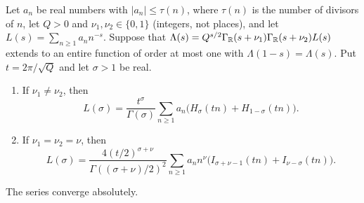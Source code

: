 \begin{lemma}\label{an:balanced-afe}
Let $a_n$ be real numbers with $|a_n|\le\tau(n)$, where $\tau(n)$ is the
number of divisors of $n$, let $Q>0$ and
$\nu_1,\nu_2\in\{0,1\}$ (integers, not places), and let
$L(s)=\sum_{n\ge1}a_nn^{-s}$. Suppose that
$\Lambda(s)=Q^{s/2}\Gamma_\mathbb R(s+\nu_1)\Gamma_\mathbb R(s+\nu_2)L(s)$ extends to an
entire function of order at most one with $\Lambda(1-s)=\Lambda(s)$. Put
$t=2\pi/\sqrt Q$ and let $\sigma>1$ be real.
\begin{enumerate}
\item If $\nu_1\ne\nu_2$, then
\[
 L(\sigma)=\frac{t^\sigma}{\Gamma(\sigma)}\sum_{n\ge1}a_n
 \bigl(H_\sigma(tn)+H_{1-\sigma}(tn)\bigr).
\]
\item If $\nu_1=\nu_2=\nu$, then
\[
 L(\sigma)=\frac{4(t/2)^{\sigma+\nu}}{\Gamma((\sigma+\nu)/2)^2}
 \sum_{n\ge1}a_nn^\nu
 \bigl(I_{\sigma+\nu-1}(tn)+I_{\nu-\sigma}(tn)\bigr).
\]
\end{enumerate}
The series converge absolutely.
\end{lemma}

